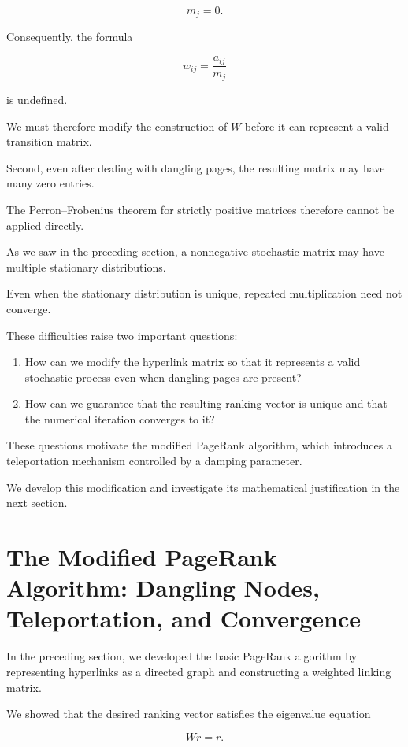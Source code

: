 \documentclass[11pt,a4paper]{article}
\theoremstyle{definition}
\theoremstyle{remark}
\begin{document}
\[
m_j=0.
\]

Consequently, the formula

\[
w_{ij}=\frac{a_{ij}}{m_j}
\]

is undefined.

We must therefore modify
the construction of $W$
before it can represent
a valid transition matrix.

Second, even after dealing
with dangling pages,
the resulting matrix may
have many zero entries.

The Perron--Frobenius
theorem for strictly
positive matrices therefore
cannot be applied directly.

As we saw in the preceding
section, a nonnegative
stochastic matrix may
have multiple stationary
distributions.

Even when the stationary
distribution is unique,
repeated multiplication
need not converge.

These difficulties raise
two important questions:

\begin{enumerate}

\item How can we modify
the hyperlink matrix so
that it represents a
valid stochastic process
even when dangling pages
are present?

\item How can we guarantee
that the resulting ranking
vector is unique and that
the numerical iteration
converges to it?

\end{enumerate}

These questions motivate
the modified PageRank
algorithm, which introduces
a teleportation mechanism
controlled by a damping
parameter.

We develop this modification
and investigate its
mathematical justification
in the next section.

\section{The Modified PageRank Algorithm:
Dangling Nodes, Teleportation, and Convergence}

In the preceding section, we developed
the basic PageRank algorithm by representing
hyperlinks as a directed graph and
constructing a weighted linking matrix.

We showed that the desired ranking vector
satisfies the eigenvalue equation

\[
Wr=r.
\]
\end{document}
